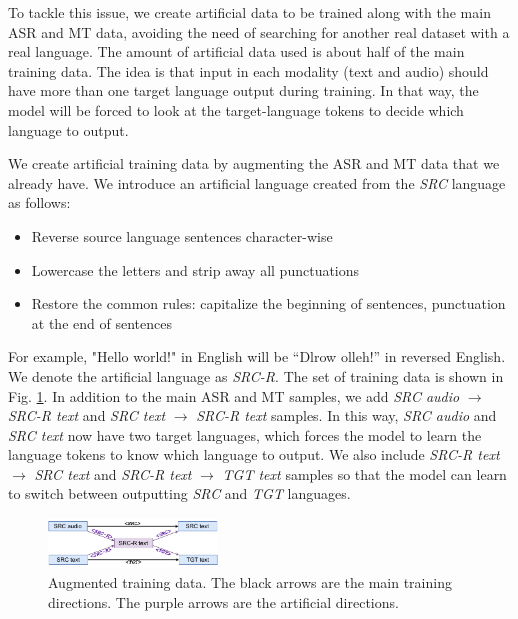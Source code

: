 \documentclass[conference]{IEEEtran}
\begin{document}
	To tackle this issue, we create artificial data to be trained along with the main ASR and MT data, avoiding the need of searching for another real dataset with a real language. The amount of artificial data used is about half of the main training data. The idea is that input in each modality (text and audio) should have more than one target language output during training. In that way, the model will be forced to look at the target-language tokens to decide which language to output. 
	
	We create artificial training data by augmenting the ASR and MT data that we already have.  We introduce an artificial language created from the \textit{SRC} language as follows:
	\begin{itemize}
		\item Reverse source language sentences character-wise
		\item Lowercase the letters and strip away all punctuations
		\item Restore the common rules: capitalize the beginning of sentences, punctuation at the end of sentences
	\end{itemize}
	For example, "Hello world!" in English will be “Dlrow olleh!” in reversed English. We denote the artificial language as \textit{SRC-R}. The set of training data is shown in Fig. \ref{fig:AD4}. In addition to the main ASR and MT samples, we add \textit{SRC audio} $\rightarrow$ \textit{SRC-R text} and \textit{SRC text} $\rightarrow$ \textit{SRC-R text} samples. In this way, \textit{SRC audio} and \textit{SRC text} now have two target languages, which forces the model to learn the language tokens to know which language to output. We also include \textit{SRC-R text} $\rightarrow$ \textit{SRC text} and \textit{SRC-R text} $\rightarrow$ \textit{TGT text} samples so that the model can learn to switch between outputting \textit{SRC} and \textit{TGT} languages. 
	
	\begin{figure}[htbp]
		\centerline{\includegraphics[width=0.4\textwidth]{charts/AD4.pdf}}
		\caption{Augmented training data. The black arrows are the main training directions. The purple arrows are the artificial directions.}
		\label{fig:AD4}
	\end{figure}
	
\end{document}
